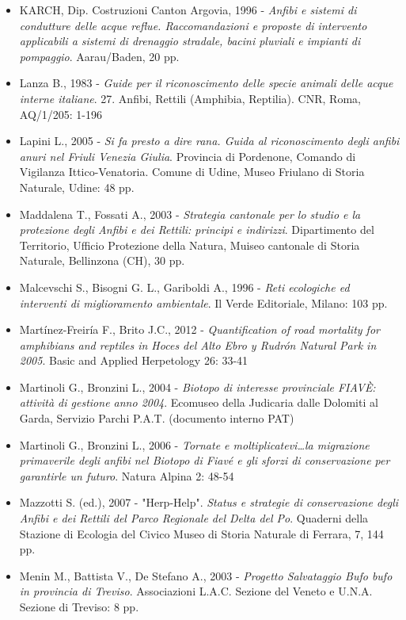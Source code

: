 \documentclass[11pt,a4paper,twoside]{memoir}
\begin{document}
\begin{itemize}
\item KARCH, Dip. Costruzioni Canton Argovia, 1996 - \emph{Anfibi e sistemi di condutture delle acque reflue. Raccomandazioni e proposte di intervento applicabili a sistemi di drenaggio stradale, bacini pluviali e impianti di pompaggio}. Aarau/Baden, 20 pp.
\item Lanza B., 1983 - \emph{Guide per il riconoscimento delle specie animali delle acque interne italiane}. 27. Anfibi, Rettili (Amphibia, Reptilia). CNR, Roma, AQ/1/205: 1-196
\item Lapini L., 2005 - \emph{Si fa presto a dire rana. Guida al riconoscimento degli anfibi anuri nel Friuli Venezia Giulia}. Provincia di Pordenone, Comando di Vigilanza Ittico-Venatoria. Comune di Udine, Museo Friulano di Storia Naturale, Udine: 48 pp.
\item Maddalena T., Fossati A., 2003 - \emph{Strategia cantonale per lo studio e la protezione degli Anfibi e dei Rettili: principi e indirizzi}. Dipartimento del Territorio, Ufficio Protezione della Natura, Muiseo cantonale di Storia Naturale, Bellinzona (CH), 30 pp.
\item Malcevschi S., Bisogni G. L., Gariboldi A., 1996 - \emph{Reti ecologiche ed interventi di miglioramento ambientale}. Il Verde Editoriale, Milano: 103 pp.
\item Martínez-Freiría F., Brito J.C., 2012 - \emph{Quantification of road mortality for amphibians and reptiles in Hoces del Alto Ebro y Rudrón Natural Park in 2005}. Basic and Applied Herpetology 26: 33-41
\item Martinoli G., Bronzini L., 2004 - \emph{Biotopo di interesse provinciale FIAVÈ: attività di gestione anno 2004}. Ecomuseo della Judicaria dalle Dolomiti al Garda, Servizio Parchi P.A.T. (documento interno PAT)
\item Martinoli G., Bronzini L., 2006 - \emph{Tornate e moltiplicatevi\dots la migrazione primaverile degli anfibi nel Biotopo di Fiavé e gli sforzi di conservazione per garantirle un futuro}. Natura Alpina 2: 48-54
\item Mazzotti S. (ed.), 2007 - "Herp-Help". \emph{Status e strategie di conservazione degli Anfibi e dei Rettili del Parco Regionale del Delta del Po}. Quaderni della Stazione di Ecologia del Civico Museo di Storia Naturale di Ferrara, 7, 144 pp.
\item Menin M., Battista V., De Stefano A., 2003 - \emph{Progetto Salvataggio \emph{Bufo bufo} in provincia di Treviso}. Associazioni L.A.C. Sezione del Veneto e U.N.A. Sezione di Treviso: 8 pp.

\end{itemize}
\end{document}
